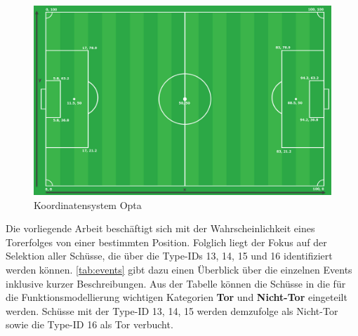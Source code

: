 \begin{figure}[H]
\centering
\includegraphics[scale=0.28]{se-wa-jpg/opta_pitch}
\caption[Koordinatensystem Opta]{Koordinatensystem Opta\protect\footnotemark}
\label{opta_pitch}
\end{figure}
\enlargethispage{2\baselineskip} 
Die vorliegende Arbeit beschäftigt sich mit der Wahrscheinlichkeit eines Torerfolges von einer bestimmten Position. Folglich liegt der Fokus auf der Selektion aller Schüsse, die über die Type-IDs \textsf{13, 14, 15} und \textsf{16} identifiziert werden können. \vref{tab:events} gibt dazu einen Überblick über die einzelnen Events inklusive kurzer Beschreibungen. Aus der Tabelle können die Schüsse in die für die Funktionsmodellierung wichtigen Kategorien \textbf{Tor} und \textbf{Nicht-Tor} eingeteilt werden. Schüsse mit der Type-ID \textsf{13, 14, 15} werden demzufolge als Nicht-Tor sowie die Type-ID \textsf{16} als Tor verbucht.

